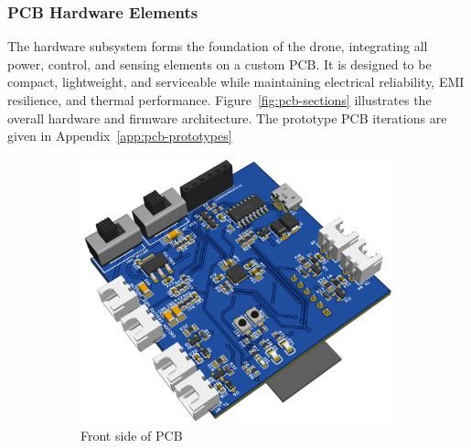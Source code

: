 \subsubsection{PCB Hardware Elements}

The hardware subsystem forms the foundation of the drone, integrating all power, control, and sensing elements on a custom PCB. It is designed to be compact, lightweight, and serviceable while maintaining electrical reliability, EMI resilience, and thermal performance. Figure~\ref{fig:pcb-sections} illustrates the overall hardware and firmware architecture. The prototype PCB iterations are given in Appendix~\ref{app:pcb-prototypes}

\begin{figure}[H]
    \centering
    \captionsetup{justification=centering, margin=1cm}
    \begin{subfigure}[b]{0.48\textwidth}
        \centering
        \includegraphics[width=\textwidth]{img/final-pcb2.png}
        \caption{Front side of PCB}
        \label{fig:pcb-front}
    \end{subfigure}
    \hfill
    \begin{subfigure}[b]{0.48\textwidth}
        \centering

\end{subfigure}
\end{figure}
